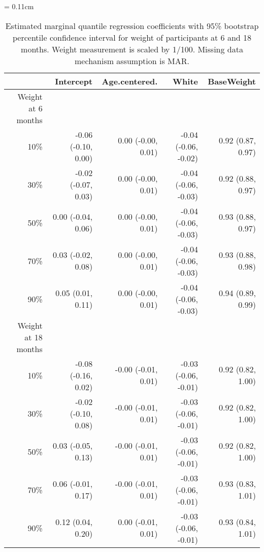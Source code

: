\documentclass[12pt]{article}
\begin{document}
\begin{table}[ht]
  \renewcommand{\arraystretch}{1.3}
  \begin{center}
    \caption{Estimated marginal quantile regression coefficients with
      95\% bootstrap percentile confidence interval for weight of
      participants at 6 and 18 months. Weight measurement is scaled by
      1/100. Missing data mechanism assumption is MAR.}\label{tab:w2}
    \vspace{10pt} \tabcolsep = 0.11cm
    \begin{tabular}{rrrrr}
      \toprule
      & Intercept           & Age.centered.       & White                & BaseWeight        \\
      \hline
      Weight at 6 months                                                                          \\
      10\%  & -0.06 (-0.10, 0.00) & 0.00 (-0.00, 0.01)  & -0.04 (-0.06, -0.02) & 0.92 (0.87, 0.97) \\
      30\% & -0.02 (-0.07, 0.03) & 0.00 (-0.00, 0.01)  & -0.04 (-0.06, -0.03) & 0.92 (0.88, 0.97) \\
      50\% & 0.00 (-0.04, 0.06)  & 0.00 (-0.00, 0.01)  & -0.04 (-0.06, -0.03) & 0.93 (0.88, 0.97) \\
      70\% & 0.03 (-0.02, 0.08)  & 0.00 (-0.00, 0.01)  & -0.04 (-0.06, -0.03) & 0.93 (0.88, 0.98) \\
      90\% & 0.05 (0.01, 0.11)   & 0.00 (-0.00, 0.01)  & -0.04 (-0.06, -0.03) & 0.94 (0.89, 0.99) \\
      Weight at 18 months                                                                         \\
      10\%  & -0.08 (-0.16, 0.02) & -0.00 (-0.01, 0.01) & -0.03 (-0.06, -0.01) & 0.92 (0.82, 1.00) \\
      30\% & -0.02 (-0.10, 0.08) & -0.00 (-0.01, 0.01) & -0.03 (-0.06, -0.01) & 0.92 (0.82, 1.00) \\
      50\% & 0.03 (-0.05, 0.13)  & -0.00 (-0.01, 0.01) & -0.03 (-0.06, -0.01) & 0.92 (0.82, 1.00) \\
      70\% & 0.06 (-0.01, 0.17)  & -0.00 (-0.01, 0.01) & -0.03 (-0.06, -0.01) & 0.93 (0.83, 1.01) \\
      90\% & 0.12 (0.04, 0.20)   & 0.00 (-0.01, 0.01)  & -0.03 (-0.06, -0.01) & 0.93 (0.84, 1.01) \\
      \bottomrule
    \end{tabular}
  \end{center}
\end{table}
\end{document}
